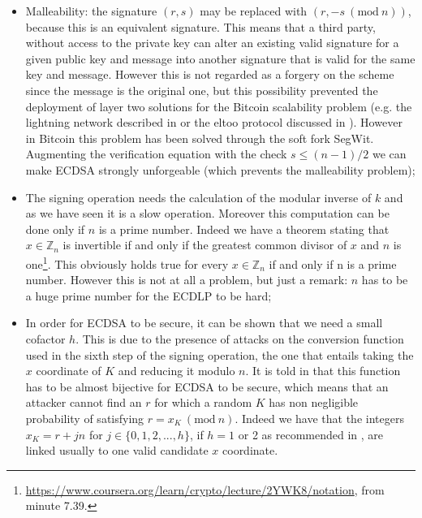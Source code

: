 \begin{itemize}
	\item Malleability: the signature $(r, s)$ may be replaced with $(r, -s \ (\text{mod} \ n))$, because this is an equivalent signature. This means that a third party, without access to the private key can alter an existing valid signature for a given public key and message into another signature that is valid for the same key and message. However this is not regarded as a forgery on the scheme since the message is the original one, but this possibility prevented the deployment of layer two solutions for the Bitcoin scalability problem (e.g. the lightning network described in \cite{RefWork:18} or the eltoo protocol discussed in \cite{RefWork:19}). However in Bitcoin this problem has been solved through the soft fork SegWit.
	\\
	Augmenting the verification equation with the check $s \leq (n - 1) / 2$ we can make ECDSA strongly unforgeable (which prevents the malleability problem);
	\item The signing operation needs the calculation of the modular inverse of $k$ and as we have seen it is a slow operation. Moreover this computation can be done only if $n$ is a prime number. Indeed we have a theorem stating that $x \in \mathbb{Z}_n$ is invertible if and only if the greatest common divisor of $x$ and $n$ is one\footnote{\url{https://www.coursera.org/learn/crypto/lecture/2YWK8/notation}, from minute 7.39.}. This obviously holds true for every $x \in \mathbb{Z}_n$ if and only if n is a prime number. However this is not at all a problem, but just a remark: $n$ has to be a huge prime number for the ECDLP to be hard;
	\item In order for ECDSA to be secure, it can be shown that we need a small cofactor $h$. This is due to the presence of attacks on the conversion function used in the sixth step of the signing operation, the one that entails taking the $x$ coordinate of $K$ and reducing it modulo $n$. It is told in \cite{RefWork:2} that this function has to be almost bijective for ECDSA to be secure, which means that an attacker cannot find an $r$ for which a random $K$ has non negligible probability of satisfying $r = x_K \ (\text{mod} \ n)$. Indeed we have that the integers $x_K = r + jn$ for $j \in \{0, 1, 2, ..., h\}$, if $h = 1$ or 2 as recommended in \cite{RefWork:3}, are linked usually to one valid candidate $x$ coordinate.
\end{itemize}

\bigskip

